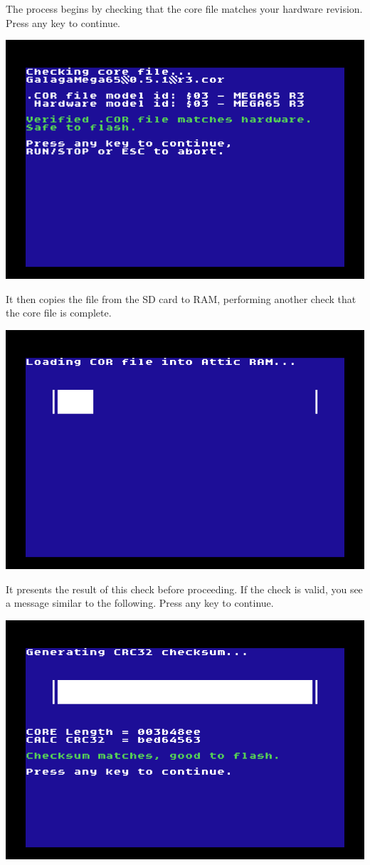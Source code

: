 The process begins by checking that the core file matches your hardware revision. Press any key to continue.

\begin{center}
  \includegraphics[width=0.7\linewidth]{images/ss-flashmenu-1-checking.png}
\end{center}

It then copies the file from the SD card to RAM, performing another check that the core file is complete.

\begin{center}
  \includegraphics[width=0.7\linewidth]{images/ss-flashmenu-2-loading.png}
\end{center}

It presents the result of this check before proceeding. If the check is valid, you see a message similar to the following. Press any key to continue.

\begin{center}
  \includegraphics[width=0.7\linewidth]{images/ss-flashmenu-3-checksum-ok.png}
\end{center}

